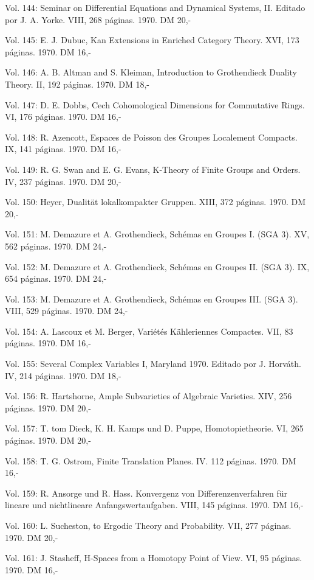 Vol. 144: Seminar on Differential Equations and Dynamical Systems, II. Editado por J. A. Yorke. VIII, 268 páginas. 1970. DM 20,-

Vol. 145: E. J. Dubuc, Kan Extensions in Enriched Category Theory. XVI, 173 páginas. 1970. DM 16,-

Vol. 146: A. B. Altman and S. Kleiman, Introduction to Grothendieck Duality Theory. II, 192 páginas. 1970. DM 18,-

Vol. 147: D. E. Dobbs, Cech Cohomological Dimensions for Commutative Rings. VI, 176 páginas. 1970. DM 16,-

Vol. 148: R. Azencott, Espaces de Poisson des Groupes Localement Compacts. IX, 141 páginas. 1970. DM 16,-

Vol. 149: R. G. Swan and E. G. Evans, K-Theory of Finite Groups and Orders. IV, 237 páginas. 1970. DM 20,-

Vol. 150: Heyer, Dualität lokalkompakter Gruppen. XIII, 372 páginas. 1970. DM 20,-

Vol. 151: M. Demazure et A. Grothendieck, Schémas en Groupes I. (SGA 3). XV, 562 páginas. 1970. DM 24,-

Vol. 152: M. Demazure et A. Grothendieck, Schémas en Groupes II. (SGA 3). IX, 654 páginas. 1970. DM 24,-

Vol. 153: M. Demazure et A. Grothendieck, Schémas en Groupes III. (SGA 3). VIII, 529 páginas. 1970. DM 24,-

Vol. 154: A. Lascoux et M. Berger, Variétés Kähleriennes Compactes. VII, 83 páginas. 1970. DM 16,-

Vol. 155: Several Complex Variables I, Maryland 1970. Editado por J. Horváth. IV, 214 páginas. 1970. DM 18,-

Vol. 156: R. Hartshorne, Ample Subvarieties of Algebraic Varieties. XIV, 256 páginas. 1970. DM 20,-

Vol. 157: T. tom Dieck, K. H. Kamps und D. Puppe, Homotopietheorie. VI, 265 páginas. 1970. DM 20,-

Vol. 158: T. G. Ostrom, Finite Translation Planes. IV. 112 páginas. 1970. DM 16,-

Vol. 159: R. Ansorge und R. Hass. Konvergenz von Differenzenverfahren für lineare und nichtlineare Anfangswertaufgaben. VIII, 145 páginas. 1970. DM 16,-

Vol. 160: L. Sucheston,  to Ergodic Theory and Probability. VII, 277 páginas. 1970. DM 20,-

Vol. 161: J. Stasheff, H-Spaces from a Homotopy Point of View. VI, 95 páginas. 1970. DM 16,-

